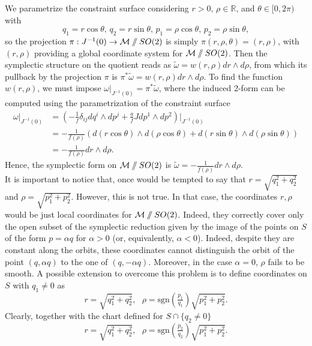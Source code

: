 \documentclass{article}
\numberwithin{equation}{section}
\theoremstyle{definition}
\newcommand{\R}{\mathbb{R}}
\newcommand{\M}{\mathcal{M}}
\newcommand{\sslash}{\mathbin{/\mkern-6mu/}}
\begin{document}
We parametrize the constraint surface considering $r>0,\,\rho\in\R$, and $\theta \in [0,2\pi)$ with
\[q_1=r\cos\theta,\,q_2=r\sin\theta,\,p_1=\rho\cos\theta,\,p_2=\rho\sin\theta,\]
so the projection $\pi:J^{-1}(0)\to\M\sslash SO(2)$ is simply $\pi(r,\rho,\theta)=(r,\rho)$, with $(r,\rho)$ providing a global coordinate system for $\M\sslash SO(2)$. Then the symplectic structure on the quotient reads as $\tilde\omega=w(r,\rho)dr\wedge d\rho$, from which its pullback by the projection $\pi$ is $\pi^*\tilde\omega=w(r,\rho)dr\wedge d\rho$. To find the function $w(r,\rho)$, we must impose $\omega|_{J^{-1}(0)}=\pi^*\tilde\omega$, where the induced 2-form can be computed using the parametrization of the constraint surface
\begin{equation}
\begin{split}
    \omega|_{J^{-1}(0)}&=\left(-\frac{1}{f}\delta_{ij}dq^i\wedge dp^j+\frac{a}{f}Jdp^1\wedge dp^2\right)|_{J^{-1}(0)}\\
    &=-\frac{1}{f(\rho)}\left(d(r\cos\theta)\wedge d(\rho\cos\theta)+d(r\sin\theta)\wedge d(\rho\sin\theta)\right)\\
    &=-\frac{1}{f(\rho)}dr\wedge d\rho.
\end{split}
\end{equation}
Hence, the symplectic form on $\M\sslash SO(2)$ is $\tilde\omega=-\frac{1}{f(\rho)}dr\wedge d\rho$. \\
It is important to notice that, once would be tempted to say that $r=\sqrt{q_1^2+q_2^2}$ and $\rho=\sqrt{p_1^2+p_2^2}$. However, this is not true. In that case, the coordinates $r,\rho$ would be just local coordinates for $\M\sslash SO(2)$. Indeed, they correctly cover only the open subset of the symplectic reduction given by the image of the points on $S$ of the form $p=\alpha q$ for $\alpha>0$ (or, equivalently, $\alpha<0$). Indeed, despite they are constant along the orbits, these coordinates cannot distinguish the orbit of the point $(q,\alpha q)$ to the one of $(q,-\alpha q)$. Moreover, in the case $\alpha=0$, $\rho$ fails to be smooth. A possible extension to overcome this problem is to define coordinates on $S$ with $q_1\neq 0$ as
\begin{equation}
    r=\sqrt{q_1^2+q_2^2},\ \ \ \rho=\mathrm{sgn}\left(\tfrac{p_1}{q_1}\right)\sqrt{p_1^2+p_2^2}.
\end{equation}
Clearly, together with the chart defined for $S\cap\{q_2\neq 0\}$
\begin{equation}
    r=\sqrt{q_1^2+q_2^2},\ \ \ \rho=\mathrm{sgn}\left(\tfrac{p_2}{q_2}\right)\sqrt{p_1^2+p_2^2}.
\end{equation}
\end{document}
